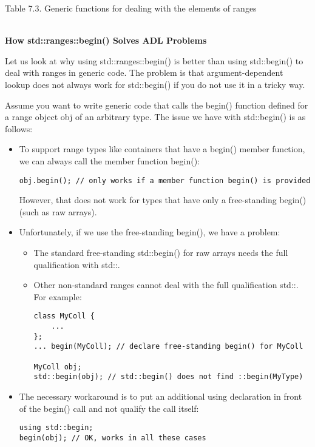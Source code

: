 \begin{center}
Table 7.3. Generic functions for dealing with the elements of ranges
\end{center}

\noindent
\hspace*{\fill} \\ %
\textbf{How std::ranges::begin() Solves ADL Problems}

Let us look at why using std::ranges::begin() is better than using std::begin() to deal with ranges in generic code. The problem is that argument-dependent lookup does not always work for std::begin() if you do not use it in a tricky way.

Assume you want to write generic code that calls the begin() function defined for a range object obj of an arbitrary type. The issue we have with std::begin() is as follows:

\begin{itemize}
\item
To support range types like containers that have a begin() member function, we can always call the member function begin():

\begin{lstlisting}[style=styleCXX]
obj.begin(); // only works if a member function begin() is provided
\end{lstlisting}

However, that does not work for types that have only a free-standing begin() (such as raw arrays).

\item
Unfortunately, if we use the free-standing begin(), we have a problem:

\begin{itemize}
\item
The standard free-standing std::begin() for raw arrays needs the full qualification with std::.

\item
Other non-standard ranges cannot deal with the full qualification std::. For example:

\begin{lstlisting}[style=styleCXX]
class MyColl {
	...
};
... begin(MyColl); // declare free-standing begin() for MyColl

MyColl obj;
std::begin(obj); // std::begin() does not find ::begin(MyType)
\end{lstlisting}
\end{itemize}

\item
The necessary workaround is to put an additional using declaration in front of the begin() call and not qualify the call itself:

\begin{lstlisting}[style=styleCXX]
using std::begin;
begin(obj); // OK, works in all these cases
\end{lstlisting}
\end{itemize}

